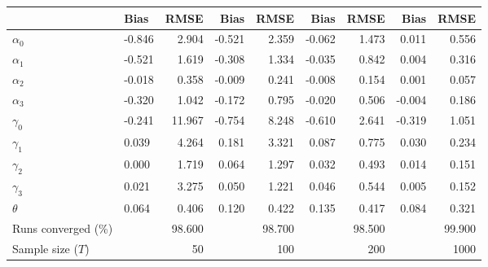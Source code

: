 
\begin{tabular}[t]{llrrrrrrr}
\toprule
  & Bias & RMSE & Bias & RMSE & Bias & RMSE & Bias & RMSE\\
\midrule
$\alpha_{0}$ & -0.846 & 2.904 & -0.521 & 2.359 & -0.062 & 1.473 & 0.011 & 0.556\\
$\alpha_{1}$ & -0.521 & 1.619 & -0.308 & 1.334 & -0.035 & 0.842 & 0.004 & 0.316\\
$\alpha_{2}$ & -0.018 & 0.358 & -0.009 & 0.241 & -0.008 & 0.154 & 0.001 & 0.057\\
$\alpha_{3}$ & -0.320 & 1.042 & -0.172 & 0.795 & -0.020 & 0.506 & -0.004 & 0.186\\
$\gamma_{0}$ & -0.241 & 11.967 & -0.754 & 8.248 & -0.610 & 2.641 & -0.319 & 1.051\\
$\gamma_{1}$ & 0.039 & 4.264 & 0.181 & 3.321 & 0.087 & 0.775 & 0.030 & 0.234\\
$\gamma_{2}$ & 0.000 & 1.719 & 0.064 & 1.297 & 0.032 & 0.493 & 0.014 & 0.151\\
$\gamma_{3}$ & 0.021 & 3.275 & 0.050 & 1.221 & 0.046 & 0.544 & 0.005 & 0.152\\
$\theta$ & 0.064 & 0.406 & 0.120 & 0.422 & 0.135 & 0.417 & 0.084 & 0.321\\
Runs converged (\%) &  & 98.600 &  & 98.700 &  & 98.500 &  & 99.900\\
Sample size ($T$) &  & 50 &  & 100 &  & 200 &  & 1000\\
\bottomrule
\end{tabular}
